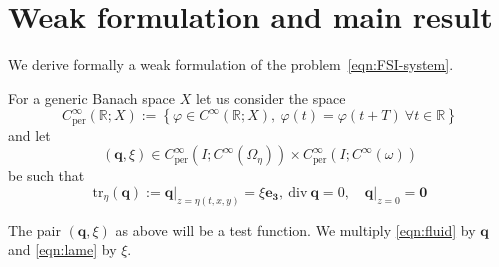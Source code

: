 \documentclass[10pt,a4paper]{article}
\numberwithin{equation}{section}
\begin{document}
\section{Weak formulation and main result}\label{ssec:defweaksol}

We derive formally a weak formulation of the problem~\eqref{eqn:FSI-system}.

For a generic Banach space $X$ let us consider the space 
\[
C_{\text{per}}^{\infty}\left(\mathbb{R};X\right):=\left\{ \varphi\in C^{\infty}\left(\mathbb{R};X\right),\ \varphi\left(t\right)=\varphi\left(t+T\right)\ \forall t\in\mathbb{R}\right\} 
\]
and let 
\[
\left(\mathbf{q},\xi\right)\in C_{\text{per}}^{\infty}\left(I;C^{\infty}\left(\Omega_{\eta}\right)\right)\times C_{\text{per}}^{\infty}\left(I;C^{\infty}\left(\omega\right)\right)
\]
be such that 
\begin{equation}
\text{tr}_{\eta}\left(\mathbf{q}\right):=\left.\mathbf{q}\right|_{z=\eta\left(t,x,y\right)}=\xi\mathbf{e_{3}},\ \text{div}\ \mathbf{q}=0,\quad\left.\mathbf{q}\right|_{z=0}=\mathbf{0}
\end{equation}



The pair  $(\mathbf{q}, \xi )$  as above will be a test function. We multiply \eqref{eqn:fluid} by $\mathbf{q}$ and \eqref{eqn:lame} by $\xi$. 
\end{document}
